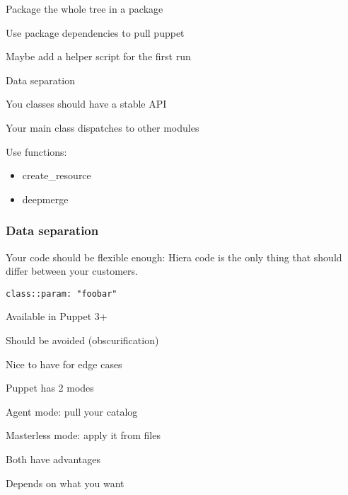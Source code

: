 \begin{iframe}
\item Package the whole tree in a package
\item Use package dependencies to pull puppet
\item Maybe add a helper script for the first run
\end{iframe}

\begin{iframe}[Hiera]
\item Data separation
\item You classes should have a stable API
\item Your main class dispatches to other modules
\item Use functions:
\begin{itemize}
    \item create\_resource
    \item deepmerge
\end{itemize}
\end{iframe}

\begin{frame}
    \frametitle{Data separation}
    \huge Your code should be flexible enough: Hiera code is the only thing that should differ between your customers.
\end{frame}

\begin{iframe}
\item{\texttt{class::param: "foobar"}}
\item Available in Puppet 3+
\item Should be avoided (obscurification)
\item Nice to have for edge cases
\end{iframe}


\begin{iframe}
\item Puppet has 2 modes
\item Agent mode: pull your catalog
\item Masterless mode: apply it from files
\item Both have advantages
\item Depends on what you want
\end{iframe}

